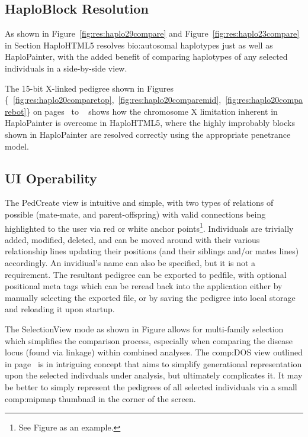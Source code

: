 \subsection{HaploBlock Resolution}
As shown in Figure~\ref{fig:res:haplo29compare} and Figure~\ref{fig:res:haplo23compare} in Section HaploHTML5 resolves \gls{bio:autosomal} haplotypes just as well as HaploPainter, with the added benefit of comparing haplotypes of any selected individuals in a side-by-side view.

The 15-bit X-linked pedigree shown in Figures \{~\ref{fig:res:haplo20comparetop},~\ref{fig:res:haplo20comparemid},~\ref{fig:res:haplo20comparebot}\} on pages~\pageref*{fig:res:haplo20comparetop} to ~\pageref*{fig:res:haplo20comparebot} shows how the chromosome X limitation inherent in HaploPainter is overcome in HaploHTML5, where the highly improbably blocks shown in HaploPainter are resolved correctly using the appropriate penetrance model.

\subsection{UI Operability}
The PedCreate view is intuitive and simple, with two types of relations of possible (mate-mate, and parent-offspring) with valid connections being highlighted to the user via red or white anchor points\footnote{See Figure as an example.}. Individuals are trivially added, modified, deleted, and can be moved around with their various relationship lines updating their positions (and their siblings and/or mates lines) accordingly. An invidiual's name can also be specified, but it is not a requirement. The resultant pedigree can be exported to pedfile, with optional positional meta tags which can be reread back into the application either by manually selecting the exported file, or by saving the pedigree into local storage and reloading it upon startup.

The SelectionView mode as shown in Figure allows for multi-family selection which simplifies the comparison process, especially when comparing the disease locus (found via linkage) within combined analyses. The \gls{comp:DOS}\label{ref:disc:dos} view outlined in page~\pageref{ref:haplo:dos} is in intriguing concept that aims to simplify generational representation upon the selected indivduals under analysis, but ultimately complicates it. It may be better to simply represent the pedigrees of all selected individuals via a small \gls{comp:mipmap} thumbnail in the corner of the screen.

